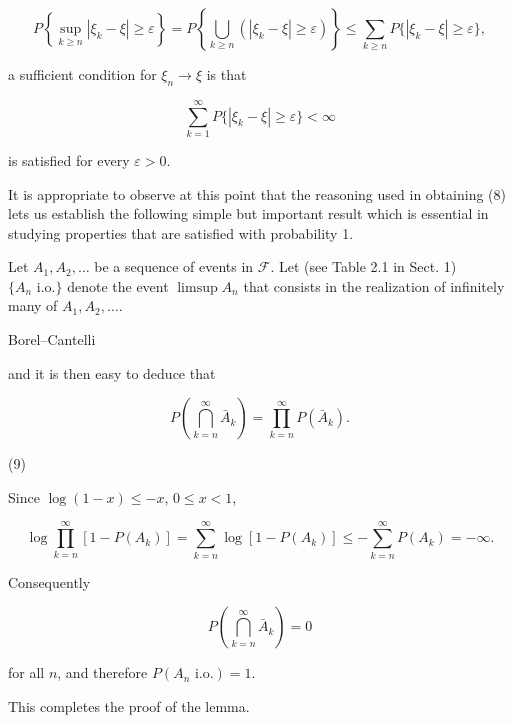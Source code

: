 $$P\left\{\sup_{k \geq n} |\xi_k - \xi| \geq \varepsilon\right\} = P\left\{\bigcup_{k \geq n} (|\xi_k - \xi| \geq \varepsilon)\right\} \leq \sum_{k \geq n} P\{|\xi_k - \xi| \geq \varepsilon\},$$

a sufficient condition for $\xi_n \to \xi$ is that

$$\sum_{k=1}^{\infty} P\{|\xi_k - \xi| \geq \varepsilon\} < \infty$$

is satisfied for every $\varepsilon > 0$.

It is appropriate to observe at this point that the reasoning used in obtaining (8) lets us establish the following simple but important result which is essential in studying properties that are satisfied with probability 1.

Let $A_1, A_2, \ldots$ be a sequence of events in $\mathcal{F}$. Let (see Table 2.1 in Sect. 1) $\{A_n \text{ i.o.}\}$ denote the event $\limsup A_n$ that consists in the realization of infinitely many of $A_1, A_2, \ldots$.

Borel–Cantelli

and it is then easy to deduce that

$$P \left( \bigcap_{k=n}^{\infty} \bar{A}_k \right) = \prod_{k=n}^{\infty} P(\bar{A}_k).$$

(9)

Since $\log(1-x) \leq -x$, $0 \leq x < 1$,

$$\log \prod_{k=n}^{\infty} [1 - P(A_k)] = \sum_{k=n}^{\infty} \log[1 - P(A_k)] \leq -\sum_{k=n}^{\infty} P(A_k) = -\infty.$$

Consequently

$$P \left( \bigcap_{k=n}^{\infty} \bar{A}_k \right) = 0$$

for all $n$, and therefore $P(A_n \text{ i.o.}) = 1$.

This completes the proof of the lemma.
